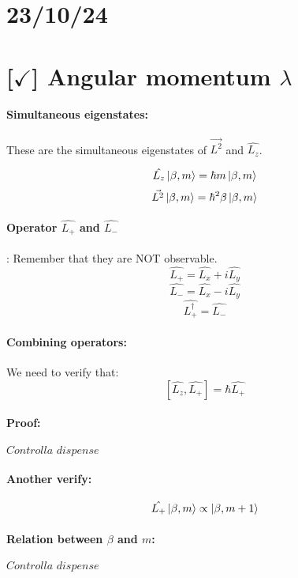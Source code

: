 \section{23/10/24}

\section{[$\checkmark$] Angular momentum $\lambda$}

\paragraph{Simultaneous eigenstates:}These are the simultaneous eigenstates of $\vec{L^2}$ and $\hat{L_z}$.

$$\hat{L_z} \ket{\beta, m} = \hbar m \ket{\beta, m}$$
$$\vec{L^2} \ket{\beta, m} = \hbar^2 \beta \ket{\beta, m}$$

\paragraph{Operator $\hat{L_+}$ and $\hat{L_-}$}: Remember that they are NOT observable.
$$\hat{L_+} = \hat{L_x} + i \hat{L_y}$$
$$\hat{L_-} = \hat{L_x} - i \hat{L_y}$$
$$\hat{L_+^{\dagger}} = \hat{L_-}$$

\paragraph{Combining operators:} We need to verify that: 
$$\left[ \hat{L_z} , \hat{L_+} \right] = \hbar \hat{L_+}$$
\paragraph{Proof:} $\textit{Controlla dispense}$

\paragraph{Another verify:}
$$\hat{L_+} \ket{\beta, m} \propto \ket{\beta, m+1}$$

\paragraph{Relation between $\beta$ and $m$:} $\textit{Controlla dispense}$
